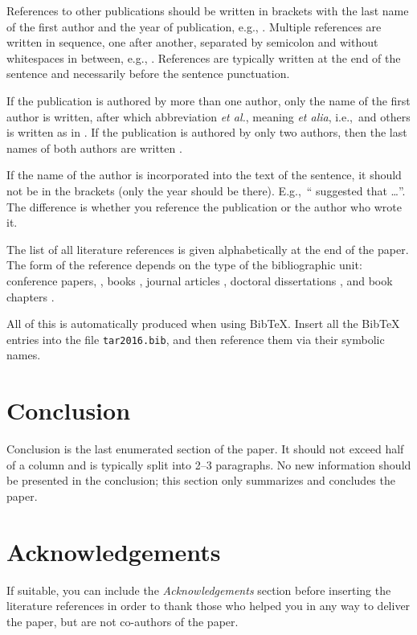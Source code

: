 \documentclass[10pt, a4paper]{article}
\begin{document}
References to other publications should be written in brackets with the last name of the first author and the year of publication, e.g., \citep{chomsky-73}.  Multiple references are written in sequence, one after another, separated by semicolon and without whitespaces in between, e.g., \citep{chomsky-73,chave-64,feigl-58}. References are typically written at the end of the sentence and necessarily before the sentence punctuation.

If the publication is authored by more than one author, only the name of the first author is written, after which abbreviation \emph{et al.}, meaning \emph{et alia}, i.e.,~and others is written as in \citep{johnson-etc}. If the publication is authored by only two authors, then the last names of both authors are written \citep{johnson-howells}.

If the name of the author is incorporated into the text of the sentence, it should not be in the brackets (only the year should be there). E.g.,~``\citet{chomsky-73}
suggested that \dots''. The difference is whether you reference the publication or the author who wrote it. 

The list of all literature references is given alphabetically at the end of the paper. The form of the reference depends on the type of the bibliographic unit: conference papers,
\citep{chave-64}, books \citep{butcher-81}, journal articles
\citep{howells-51}, doctoral dissertations \citep{croft-78}, and book chapters \citep{feigl-58}. 

All of this is automatically produced when using BibTeX. Insert all the BibTeX entries into the file \texttt{tar2016.bib}, and then reference them via their symbolic names.

\section{Conclusion}

Conclusion is the last enumerated section of the paper. It should not exceed half of a column and is typically split into 2--3 paragraphs. No new information should be presented in the conclusion; this section only summarizes and concludes the paper.

\section*{Acknowledgements}

If suitable, you can include the \textit{Acknowledgements} section before inserting the literature references  in order to thank those who helped you in any way to deliver the paper, but are not co-authors of the paper.


 
\end{document}
